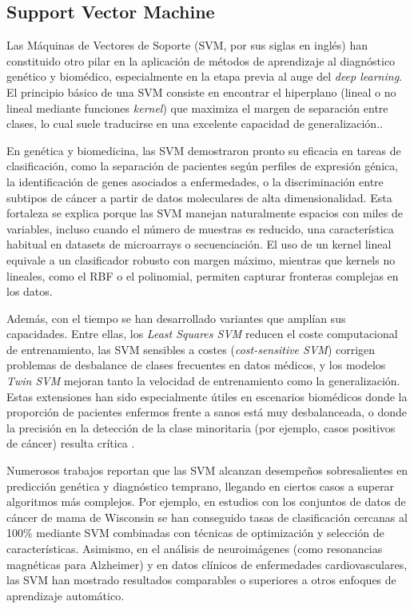 \documentclass[11pt,a4paper,spanish]{book}
\numberwithin{equation}{chapter}
\numberwithin{figure}{chapter}
\begin{document}
\subsection{Support Vector Machine}

Las Máquinas de Vectores de Soporte (SVM, por sus siglas en inglés) han constituido otro pilar en la aplicación de métodos de aprendizaje al diagnóstico genético y biomédico, especialmente en la etapa previa al auge del \textit{deep learning}\cite{info15040235,Libbrecht2015}. El principio básico de una SVM consiste en encontrar el hiperplano (lineal o no lineal mediante funciones \textit{kernel}) que maximiza el margen de separación entre clases, lo cual suele traducirse en una excelente capacidad de generalización\cite{cortes1995}.. 

En genética y biomedicina, las SVM demostraron pronto su eficacia en tareas de clasificación, como la separación de pacientes según perfiles de expresión génica, la identificación de genes asociados a enfermedades, o la discriminación entre subtipos de cáncer a partir de datos moleculares de alta dimensionalidad\cite{dudoit2002,Libbrecht2015,info15040235}. Esta fortaleza se explica porque las SVM manejan naturalmente espacios con miles de variables, incluso cuando el número de muestras es reducido, una característica habitual en datasets de microarrays o secuenciación. El uso de un kernel lineal equivale a un clasificador robusto con margen máximo, mientras que kernels no lineales, como el RBF o el polinomial, permiten capturar fronteras complejas en los datos.

Además, con el tiempo se han desarrollado variantes que amplían sus capacidades. Entre ellas, los \textit{Least Squares SVM} reducen el coste computacional de entrenamiento\cite{suykens1999}, las SVM sensibles a costes (\textit{cost-sensitive SVM}) corrigen problemas de desbalance de clases frecuentes en datos médicos\cite{Veropoulos1999}, y los modelos \textit{Twin SVM} mejoran tanto la velocidad de entrenamiento como la generalización\cite{khemchandani2007}. Estas extensiones han sido especialmente útiles en escenarios biomédicos donde la proporción de pacientes enfermos frente a sanos está muy desbalanceada, o donde la precisión en la detección de la clase minoritaria (por ejemplo, casos positivos de cáncer) resulta crítica \cite{info15040235,Libbrecht2015}. 

Numerosos trabajos reportan que las SVM alcanzan desempeños sobresalientes en predicción genética y diagnóstico temprano, llegando en ciertos casos a superar algoritmos más complejos. Por ejemplo, en estudios con los conjuntos de datos de cáncer de mama de Wisconsin se han conseguido tasas de clasificación cercanas al 100\% mediante SVM combinadas con técnicas de optimización y selección de características. Asimismo, en el análisis de neuroimágenes (como resonancias magnéticas para Alzheimer) y en datos clínicos de enfermedades cardiovasculares, las SVM han mostrado resultados comparables o superiores a otros enfoques de aprendizaje automático. 
\end{document}
